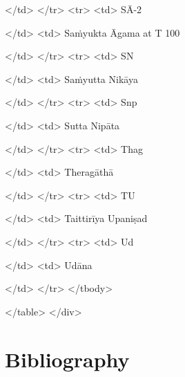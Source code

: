 \documentclass[10pt, openany]{book}
\begin{document}
</td>
</tr>
<tr>
<td>
SĀ-2


</td>
<td>
Saṁyukta Āgama at T 100


</td>
</tr>
<tr>
<td>
SN


</td>
<td>
Saṁyutta Nikāya


</td>
</tr>
<tr>
<td>
Snp


</td>
<td>
Sutta Nipāta


</td>
</tr>
<tr>
<td>
Thag


</td>
<td>
Theragāthā


</td>
</tr>
<tr>
<td>
TU


</td>
<td>
Taittirīya Upaniṣad


</td>
</tr>
<tr>
<td>
Ud


</td>
<td>
Udāna


</td>
</tr>
</tbody>

</table>
</div>

\section{Bibliography}
\end{document}
